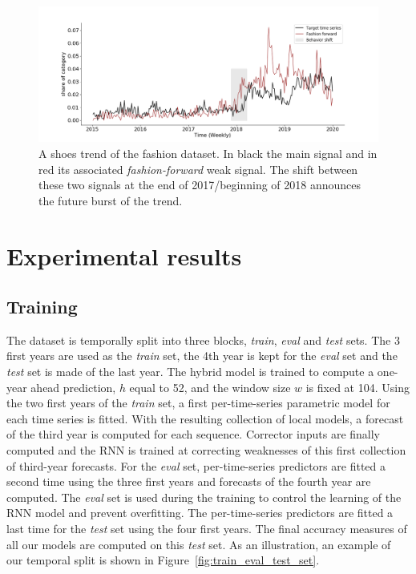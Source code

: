 \documentclass[lettersize,journal]{IEEEtran}
\newcommand{\lag}{h}
\newcommand{\window}{w}
\begin{document}
\begin{figure}
  \centering
    \includegraphics[width=1.\linewidth]{figure/ff_example}
  \caption{A shoes trend of the fashion dataset. In black the main signal and in red its associated \textit{fashion-forward} weak signal. The shift between these two signals at the end of 2017/beginning of 2018 announces the future burst of the trend.}
\label{fig:oneemergingtrend}
\end{figure}





\section{Experimental results}
\label{sec:exp}

\subsection{Training}
The dataset is temporally split into three blocks, {\em train}, {\em eval} and {\em test} sets. The 3 first years are used as the {\em train} set, the 4th year is kept for the {\em eval} set and the {\em test} set is made of the last year. The hybrid model is trained to compute a one-year ahead prediction, $\lag$ equal to 52, and the window size $\window$ is fixed at 104.
Using the two first years of the {\em train} set, a first per-time-series parametric model for each time series is fitted. With the resulting collection of local models, a forecast of the third year is computed for each sequence. Corrector inputs are finally computed and the RNN is trained at correcting weaknesses of this first collection of third-year forecasts. For the {\em eval} set, per-time-series predictors are fitted a second time using the three first years and forecasts of the fourth year are computed. The {\em eval} set is used during the training to control the learning of the RNN model and prevent overfitting. The per-time-series predictors are fitted a last time for the {\em test} set using the four first years. The final accuracy measures of all our models are computed on this {\em test} set. As an illustration, an example of our temporal split is shown in Figure~\ref{fig:train_eval_test_set}.
\end{document}
